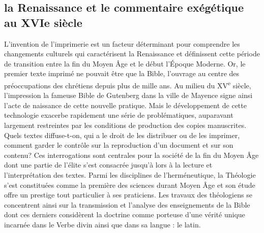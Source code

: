 \documentclass[11pt,french]{article}
\begin{document}
\subsection{ la Renaissance et le commentaire exégétique au XVIe siècle} %
L'invention de l'imprimerie est un facteur déterminant pour comprendre les changements culturels qui caractérisent la Renaissance et définissent cette période de transition entre la fin du Moyen Âge et le début l'Époque Moderne. Or, le premier texte imprimé ne pouvait être que la Bible, l'ouvrage au centre des préoccupations des chrétiens depuis plus de mille ans. Au milieu du XV\textsuperscript{e} siècle, l'impression la fameuse Bible de Gutenberg  dans la ville de Mayence signe ainsi l'acte de naissance de cette nouvelle pratique. Mais le développement de cette technologie exacerbe rapidement une série de problématiques, auparavant largement restreintes par les conditions de production des copies manuscrites. Quels textes diffuse-t-on, qui a le droit de les distribuer ou de les imprimer, comment garder le contrôle sur la reproduction d'un document et sur son contenu? Ces interrogations sont centrales pour la société de la fin du Moyen Âge dont une partie de l'élite s'est consacrée jusqu'à lors à la lecture et l'interprétation des textes. Parmi les disciplines de l'herméneutique, la Théologie s'est constituées comme la première des sciences durant Moyen Âge et son étude offre un prestige tout particulier à ses praticiens. Les travaux des théologiens se concentrent ainsi sur la transmission et l'analyse des enseignements de la Bible dont ces derniers considèrent la doctrine comme porteuse d'une vérité unique incarnée dans le Verbe divin ainsi que dans sa langue : le latin.\par 
\end{document}

